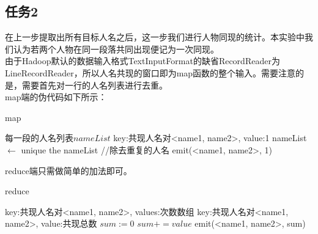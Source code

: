 \subsection{任务2}
在上一步提取出所有目标人名之后，这一步我们进行人物同现的统计。本实验中我们认为若两个人物在同一段落共同出现便记为一次同现。\\
\indent 由于Hadoop默认的数据输入格式TextInputFormat的缺省RecordReader为LineRecordReader，所以人名共现的窗口即为map函数的整个输入。需要注意的是，需要首先对一行的人名列表进行去重。\\
map端的伪代码如下所示：
\begin{algorithm}[H]
	\caption{map}
	\begin{algorithmic}[1]
		\REQUIRE 每一段的人名列表$nameList$
		\ENSURE key:共现人名对<name1, name2>, value:1
		\STATE nameList $\leftarrow$ unique the nameList //除去重复的人名
					\STATE emit(<name1, name2>, 1)
				\ENDIF
			\ENDFOR
		\ENDFOR
	\end{algorithmic}
\end{algorithm}
reduce端只需做简单的加法即可。
\begin{algorithm}[H]
	\caption{reduce}
	\begin{algorithmic}[1]
		\REQUIRE key:共现人名对<name1, name2>, values:次数数组
		\ENSURE key:共现人名对<name1, name2>, value:共现总数
		\STATE $sum:=0$
			\STATE $sum += value$
		\ENDFOR
		\STATE emit(<name1, name2>, sum)
	\end{algorithmic}
\end{algorithm}
